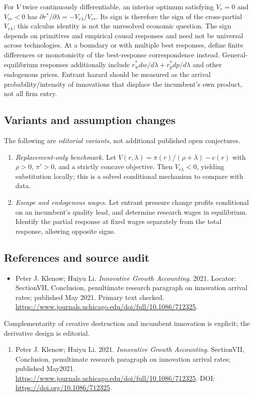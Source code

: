 \documentclass[11pt,a4paper]{article}
\begin{document}
For \(V\) twice continuously differentiable, an interior optimum satisfying \(V_r=0\) and \(V_{rr}<0\) has \(\partial r^*/\partial\lambda=-V_{r\lambda}/V_{rr}\). Its sign is therefore the sign of the cross-partial \(V_{r\lambda}\); this calculus identity is not the unresolved economic question. The sign depends on primitives and empirical causal responses and need not be universal across technologies. At a boundary or with multiple best responses, define finite differences or monotonicity of the best-response correspondence instead. General-equilibrium responses additionally include \(r_w^*dw/d\lambda+r_p^*dp/d\lambda\) and other endogenous prices. Entrant hazard should be measured as the arrival probability/intensity of innovations that displace the incumbent's own product, not all firm entry.
\subsection*{Variants and assumption changes}
The following are \emph{editorial variants}, not additional published open conjectures.
\begin{enumerate}
\item \emph{Replacement-only benchmark.} Let \(V(r,\lambda)=\pi(r)/(\rho+\lambda)-c(r)\) with \(\rho>0\), \(\pi'>0\), and a strictly concave objective. Then \(V_{r\lambda}<0\), yielding substitution locally; this is a solved conditional mechanism to compare with data.
\item \emph{Escape and endogenous wages.} Let entrant pressure change profits conditional on an incumbent's quality lead, and determine research wages in equilibrium. Identify the partial response at fixed wages separately from the total response, allowing opposite signs.
\end{enumerate}
\subsection*{References and source audit}
\begin{itemize}
\item Peter J. Klenow; Huiyu Li. \emph{Innovative Growth Accounting}. 2021. Locator: SectionVII, Conclusion, penultimate research paragraph on innovation arrival rates; published May 2021. Primary text checked. \url{https://www.journals.uchicago.edu/doi/full/10.1086/712325}.
\end{itemize}
Complementarity of creative destruction and incumbent innovation is explicit; the derivative design is editorial.
\begin{enumerate}\raggedright
\item\hypertarget{definitions:source:30007547:1}{} Peter J. Klenow; Huiyu Li. 2021. \emph{Innovative Growth Accounting}. SectionVII, Conclusion, penultimate research paragraph on innovation arrival rates; published May2021.
\url{https://www.journals.uchicago.edu/doi/full/10.1086/712325}.
DOI: \url{https://doi.org/10.1086/712325}.
\end{enumerate}
\end{document}
